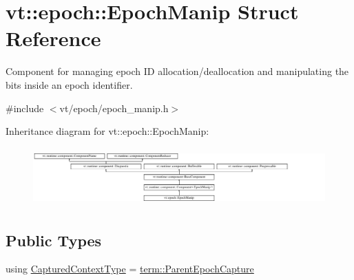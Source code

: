 \hypertarget{structvt_1_1epoch_1_1_epoch_manip}{}\section{vt\+:\+:epoch\+:\+:Epoch\+Manip Struct Reference}
\label{structvt_1_1epoch_1_1_epoch_manip}


Component for managing epoch ID allocation/deallocation and manipulating the bits inside an epoch identifier.  




{\ttfamily \#include $<$vt/epoch/epoch\+\_\+manip.\+h$>$}

Inheritance diagram for vt\+:\+:epoch\+:\+:Epoch\+Manip\+:\begin{figure}[H]
\begin{center}
\leavevmode
\includegraphics[height=2.272727cm]{structvt_1_1epoch_1_1_epoch_manip}
\end{center}
\end{figure}
\subsection*{Public Types}
\begin{DoxyCompactItemize}
\item 
using \hyperlink{structvt_1_1epoch_1_1_epoch_manip_ab1fe66501b6b83b07fd4188fc6a8a4fe}{Captured\+Context\+Type} = \hyperlink{structvt_1_1term_1_1_parent_epoch_capture}{term\+::\+Parent\+Epoch\+Capture}
\end{DoxyCompactItemize}
